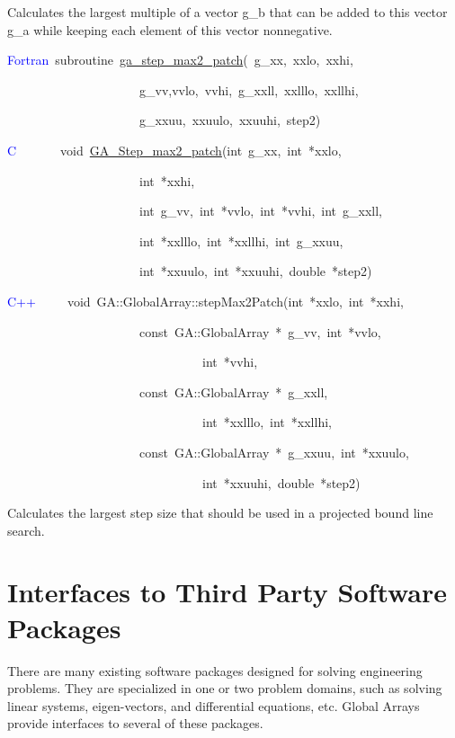 Calculates the largest multiple of a vector g\_b that can be added
to this vector g\_a while keeping each element of this vector nonnegative. 
\begin{lyxcode}
\textcolor{blue}{Fortran}~subroutine~\href{http://www.emsl.pnl.gov/docs/global/ga_ops.html\#ga_step_max2_patch}{ga\_{}step\_{}max2\_{}patch}(~g\_xx,~xxlo,~xxhi,~

~~~~~~~~~~~~~~~~~~~~~g\_vv,vvlo,~vvhi,~g\_xxll,~xxlllo,~xxllhi,~

~~~~~~~~~~~~~~~~~~~~~g\_xxuu,~xxuulo,~xxuuhi,~step2)~

\textcolor{blue}{C}~~~~~~~void~\href{http://www.emsl.pnl.gov/docs/global/c_nga_ops.html\#ga_step_max2_patch}{GA\_{}Step\_{}max2\_{}patch}(int~g\_xx,~int~{*}xxlo,~

~~~~~~~~~~~~~~~~~~~~~int~{*}xxhi,

~~~~~~~~~~~~~~~~~~~~~int~g\_vv,~int~{*}vvlo,~int~{*}vvhi,~int~g\_xxll,~

~~~~~~~~~~~~~~~~~~~~~int~{*}xxlllo,~int~{*}xxllhi,~int~g\_xxuu,~

~~~~~~~~~~~~~~~~~~~~~int~{*}xxuulo,~int~{*}xxuuhi,~double~{*}step2)~

\textcolor{blue}{C++}~~~~~void~GA::GlobalArray::stepMax2Patch(int~{*}xxlo,~int~{*}xxhi,

~~~~~~~~~~~~~~~~~~~~~const~GA::GlobalArray~{*}~g\_vv,~int~{*}vvlo,~

~~~~~~~~~~~~~~~~~~~~~~~~~~~~~~~int~{*}vvhi,~

~~~~~~~~~~~~~~~~~~~~~const~GA::GlobalArray~{*}~g\_xxll,~

~~~~~~~~~~~~~~~~~~~~~~~~~~~~~~~int~{*}xxlllo,~int~{*}xxllhi,~

~~~~~~~~~~~~~~~~~~~~~const~GA::GlobalArray~{*}~g\_xxuu,~int~{*}xxuulo,~

~~~~~~~~~~~~~~~~~~~~~~~~~~~~~~~int~{*}xxuuhi,~double~{*}step2)
\end{lyxcode}
Calculates the largest step size that should be used in a projected
bound line search. 


\section{Interfaces to Third Party Software Packages }

There are many existing software packages designed for solving engineering
problems. They are specialized in one or two problem domains, such
as solving linear systems, eigen-vectors, and differential equations,
etc. Global Arrays provide interfaces to several of these packages. 


